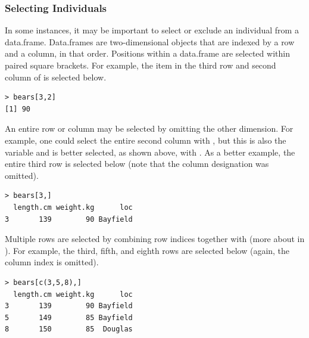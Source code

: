 \documentclass[10pt,openany]{book}\usepackage[]{graphicx}\usepackage[]{color}
\makeatletter
\newenvironment{kframe}{%
 \def\at@end@of@kframe{}%
 \ifinner\ifhmode%
  \def\at@end@of@kframe{\end{minipage}}%
  \begin{minipage}{\columnwidth}%
 \fi\fi%
 \def\FrameCommand##1{\hskip\@totalleftmargin \hskip-\fboxsep
 \colorbox{shadecolor}{##1}\hskip-\fboxsep
     \hskip-\linewidth \hskip-\@totalleftmargin \hskip\columnwidth}%
 \MakeFramed {\advance\hsize-\width
   \@totalleftmargin\z@ \linewidth\hsize
   \@setminipage}}%
 {\par\unskip\endMakeFramed%
 \at@end@of@kframe}
\newenvironment{knitrout}{}{} %
\makeatother
\begin{document}

\subsubsection{Selecting Individuals}  \label{sect:RSelectIndivs}
In some instances, it may be important to select or exclude an individual from a data.frame.  Data.frames are two-dimensional objects that are indexed by a row and a column, in that order.  Positions within a data.frame are selected within paired square brackets.  For example, the item in the third row and second column of  is selected below.
\begin{knitrout}
\color{fgcolor}\begin{kframe}
\begin{verbatim}
> bears[3,2]
[1] 90
\end{verbatim}
\end{kframe}
\end{knitrout}


An entire row or column may be selected by omitting the other dimension.  For example, one could select the entire second column with , but this is also the  variable and is better selected, as shown above, with .  As a better example, the entire third row is selected below (note that the column designation was omitted).
\begin{knitrout}
\color{fgcolor}\begin{kframe}
\begin{verbatim}
> bears[3,]
  length.cm weight.kg      loc
3       139        90 Bayfield
\end{verbatim}
\end{kframe}
\end{knitrout}

Multiple rows are selected by combining row indices together with  (more about  in ).  For example, the third, fifth, and eighth rows are selected below (again, the column index is omitted).
\begin{knitrout}
\color{fgcolor}\begin{kframe}
\begin{verbatim}
> bears[c(3,5,8),]
  length.cm weight.kg      loc
3       139        90 Bayfield
5       149        85 Bayfield
8       150        85  Douglas
\end{verbatim}
\end{kframe}
\end{knitrout}
\end{document}

